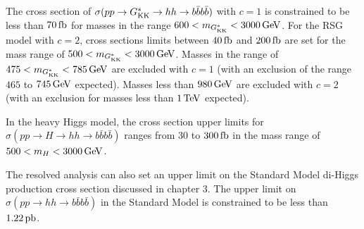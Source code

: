 The cross section of $\sigma(pp \to G^*_{\rm KK} \to hh \to b\bar{b}b\bar{b})$ with $c=1$ is constrained to be less than $70 \mbox{\,fb}$ for masses in the range $600 < m_{\Gkk} < 3000 \GeV$. For the RSG model with $c=2$, cross sections limits between $40\mbox{\,fb}$ and $200 \mbox{\,fb}$ are set for the mass range of $500 < m_{\Gkk} < 3000 \GeV$. Masses in the range of $475 < m_{\Gkk} < 785 \GeV$ are excluded with $c=1$ (with an exclusion of the range $465$ to $745 \GeV$ expected). Masses less than $980 \GeV$ are excluded with $c=2$ (with an exclusion for masses less than $1 \TeV$ expected). 

In the heavy Higgs model, the cross section upper limits for $\sigma(pp \to H \to hh \to b\bar{b}b\bar{b})$ ranges from $30$ to $300 \mbox{\,fb}$ in the mass range of $500 < m_{H} < 3000 \GeV$. 

The resolved analysis can also set an upper limit on the Standard Model di-Higgs production cross section discussed in chapter 3. The upper limit on $\sigma(pp \to hh \to b\bar{b}b\bar{b})$ in the Standard Model is constrained to be less than $1.22 \mbox{\,pb}$. 


